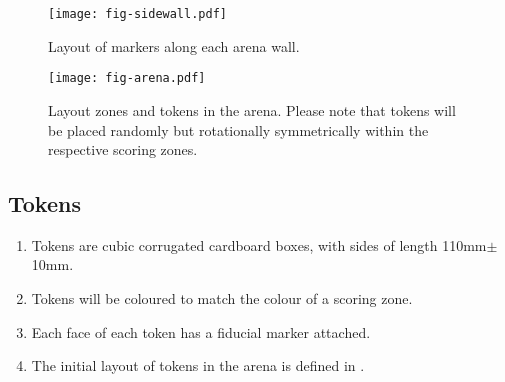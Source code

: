 \begin{sidewaysfigure}
  \texttt{[image: fig-sidewall.pdf]}
  \caption{Layout of markers along each arena wall.}
  \label{fig:sidewall}
\end{sidewaysfigure}

\begin{figure}
  \texttt{[image: fig-arena.pdf]}
  \caption{Layout zones and tokens in the arena. Please note that tokens will
  be placed randomly but rotationally symmetrically within the respective
  scoring zones.}
  \label{fig:arena}
\end{figure}

\subsection{Tokens}
\label{spec:tokens}

\begin{enumerate}
  \item Tokens are cubic corrugated cardboard boxes, with sides of length
        \si{110}{mm}$\pm$\si{10}{mm}.
  \item Tokens will be coloured to match the colour of a scoring zone.
  \item Each face of each token has a fiducial marker attached.
  \item The initial layout of tokens in the arena is defined in
        .
\end{enumerate}
